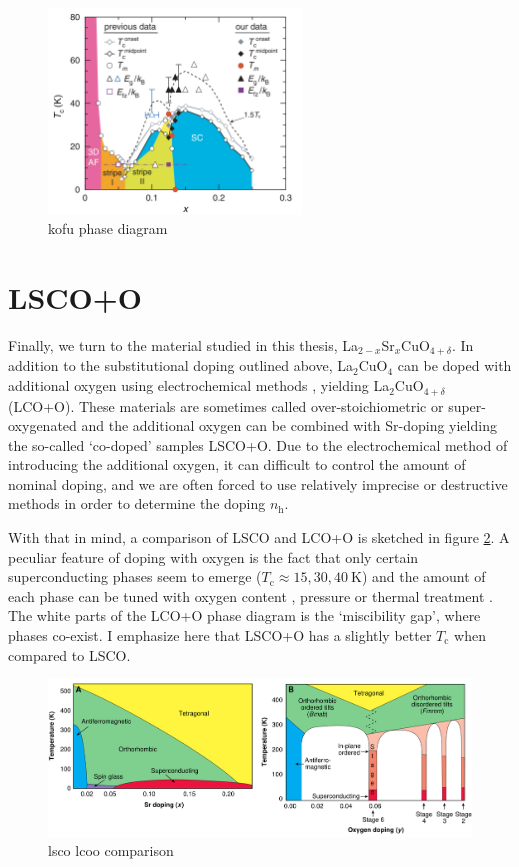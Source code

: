 \begin{figure}
    \centering
    \includegraphics[width=0.6\textwidth]{fig/intro/kofu_phase.png}
    \caption[kofu phase diagram]{kofu phase diagram \cite{Kofu2009}}
    \label{fig:kofu_phase}
\end{figure}

\section{LSCO+O}\label{sec:lscoo}
Finally, we turn to the material studied in this thesis, La$_{2-x}$Sr$_x$CuO$_{4+\delta}$. In addition to the substitutional doping outlined above, La$_2$CuO$_4$ can be doped with additional oxygen using electrochemical methods \cite{Blakeslee1998}, yielding La$_2$CuO$_{4+\delta}$ (LCO+O). These materials are sometimes called over-stoichiometric or super-oxygenated and the additional oxygen can be combined with Sr-doping yielding the so-called `co-doped' samples  LSCO+O. Due to the electrochemical method of introducing the additional oxygen, it can difficult to control the amount of nominal doping, and we are often forced to use relatively imprecise or destructive methods in order to determine the doping $n_\text{h}$.

With that in mind, a comparison of LSCO and LCO+O is sketched in figure \ref{fig:phase_wells}. A peculiar feature of doping with oxygen is the fact that only certain superconducting phases seem to emerge ($T_\text{c} \approx 15, 30, \SI{40}{\kelvin}$) and the amount of each phase can be tuned with oxygen content \cite{Liu2005}, pressure \cite{Lorenz2002} or thermal treatment \cite{Fratini2010}. The white parts of the LCO+O phase diagram is the `miscibility gap', where phases co-exist. I emphasize here that LSCO+O has a slightly better $T_\text{c}$ when compared to LSCO.

\begin{figure}
    \centering
    \includegraphics[width=\textwidth]{fig/intro/phases_wells.png}
    \caption[lsco lcoo comparison]{lsco lcoo comparison \cite{Wells1997}}
    \label{fig:phase_wells}
\end{figure}

